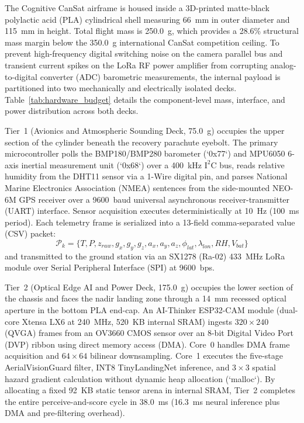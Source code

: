 \documentclass[conference]{IEEEtran}
\begin{document}
The Cognitive CanSat airframe is housed inside a 3D-printed matte-black polylactic acid (PLA) cylindrical shell measuring 66~mm in outer diameter and 115~mm in height. Total flight mass is 250.0~g, which provides a 28.6\% structural mass margin below the 350.0~g international CanSat competition ceiling. To prevent high-frequency digital switching noise on the camera parallel bus and transient current spikes on the LoRa RF power amplifier from corrupting analog-to-digital converter (ADC) barometric measurements, the internal payload is partitioned into two mechanically and electrically isolated decks. Table~\ref{tab:hardware_budget} details the component-level mass, interface, and power distribution across both decks.

Tier~1 (Avionics and Atmospheric Sounding Deck, 75.0~g) occupies the upper section of the cylinder beneath the recovery parachute eyebolt. The primary microcontroller polls the BMP180/BMP280 barometer (`0x77`) and MPU6050 6-axis inertial measurement unit (`0x68`) over a 400~kHz $\text{I}^2\text{C}$ bus, reads relative humidity from the DHT11 sensor via a 1-Wire digital pin, and parses National Marine Electronics Association (NMEA) sentences from the side-mounted NEO-6M GPS receiver over a 9600~baud universal asynchronous receiver-transmitter (UART) interface. Sensor acquisition executes deterministically at 10~Hz (100~ms period). Each telemetry frame is serialized into a 13-field comma-separated value (CSV) packet:
\begin{equation}
\mathcal{P}_{k} = \{T, P, z_{raw}, g_x, g_y, g_z, a_x, a_y, a_z, \phi_{lat}, \lambda_{lon}, RH, V_{bat}\}
\label{eq:csv_packet}
\end{equation}
and transmitted to the ground station via an SX1278 (Ra-02) 433~MHz LoRa module over Serial Peripheral Interface (SPI) at 9600~bps.

Tier~2 (Optical Edge AI and Power Deck, 175.0~g) occupies the lower section of the chassis and faces the nadir landing zone through a 14~mm recessed optical aperture in the bottom PLA end-cap. An AI-Thinker ESP32-CAM module (dual-core Xtensa LX6 at 240~MHz, 520~KB internal SRAM) ingests $320 \times 240$ (QVGA) frames from an OV3660 CMOS sensor over an 8-bit Digital Video Port (DVP) ribbon using direct memory access (DMA). Core~0 handles DMA frame acquisition and $64 \times 64$ bilinear downsampling. Core~1 executes the five-stage AerialVisionGuard filter, INT8 TinyLandingNet inference, and $3 \times 3$ spatial hazard gradient calculation without dynamic heap allocation (`malloc`). By allocating a fixed 92~KB static tensor arena in internal SRAM, Tier~2 completes the entire perceive-and-score cycle in 38.0~ms (16.3~ms neural inference plus DMA and pre-filtering overhead).
\end{document}
